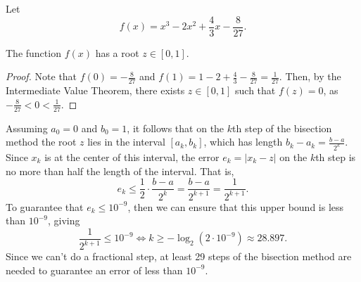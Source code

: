 \documentclass{homework}
\begin{document}
\maketitle

\question
Let
\begin{equation*}
	f(x) = x^3 - 2x^2 + \frac{4}{3}x - \frac{8}{27}.
\end{equation*}

\begin{alphaparts}
	\questionpart The function $f(x)$ has a root $z \in [0,1]$.
	\begin{proof}
		Note that $f(0) = -\frac{8}{27}$ and $f(1) = 1 - 2 + \frac{4}{3} - \frac{8}{27} = \frac{1}{27}$. Then, by the Intermediate Value Theorem, there exists $z \in [0,1]$ such that $f(z) = 0$, as $-\frac{8}{27} < 0 < \frac{1}{27}$.
	\end{proof}
	
	\questionpart Assuming $a_0 = 0$ and $b_0 = 1$, it follows that on the $k$th step of the bisection method the root $z$ lies in the interval $[a_k, b_k]$, which has length $b_k - a_k = \frac{b-a}{2^k}$. Since $x_k$ is at the center of this interval, the error $e_k = |x_k - z|$ on the $k$th step is no more than half the length of the interval. That is,
	\begin{equation*}
		e_k \le \frac{1}{2}\cdot\frac{b-a}{2^k} = \frac{b-a}{2^{k+1}} = \frac{1}{2^{k+1}}.
	\end{equation*}
	To guarantee that $e_k \le 10^{-9}$, then we can ensure that this upper bound is less than $10^{-9}$, giving
	\begin{equation*}
		\frac{1}{2^{k+1}} \le 10^{-9} \iff k \ge -\log_2(2\cdot 10^{-9}) \approx 28.897.
	\end{equation*}
	Since we can't do a fractional step, at least 29 steps of the bisection method are needed to guarantee an error of less than $10^{-9}$.
	

\end{alphaparts}
\end{document}
